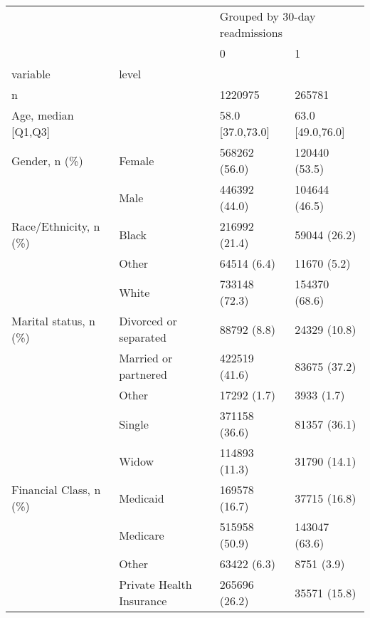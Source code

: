 \begin{tabular}{llll}
\toprule
                                       &   & \multicolumn{2}{l}{Grouped by 30-day readmissions} \\
                                       &   &                              0 &                 1 \\
variable & level &                                &                   \\
\midrule
n &   &                        1220975 &            265781 \\
Age, median [Q1,Q3] &   &               58.0 [37.0,73.0] &  63.0 [49.0,76.0] \\
Gender, n (\%) & Female &                  568262 (56.0) &     120440 (53.5) \\
                                       & Male &                  446392 (44.0) &     104644 (46.5) \\
Race/Ethnicity, n (\%) & Black &                  216992 (21.4) &      59044 (26.2) \\
                                       & Other &                    64514 (6.4) &       11670 (5.2) \\
                                       & White &                  733148 (72.3) &     154370 (68.6) \\
Marital status, n (\%) & Divorced or separated &                    88792 (8.8) &      24329 (10.8) \\
                                       & Married or partnered &                  422519 (41.6) &      83675 (37.2) \\
                                       & Other &                    17292 (1.7) &        3933 (1.7) \\
                                       & Single &                  371158 (36.6) &      81357 (36.1) \\
                                       & Widow &                  114893 (11.3) &      31790 (14.1) \\
Financial Class, n (\%) & Medicaid &                  169578 (16.7) &      37715 (16.8) \\
                                       & Medicare &                  515958 (50.9) &     143047 (63.6) \\
                                       & Other &                    63422 (6.3) &        8751 (3.9) \\
                                       & Private Health Insurance &                  265696 (26.2) &      35571 (15.8) \\

\end{tabular}
